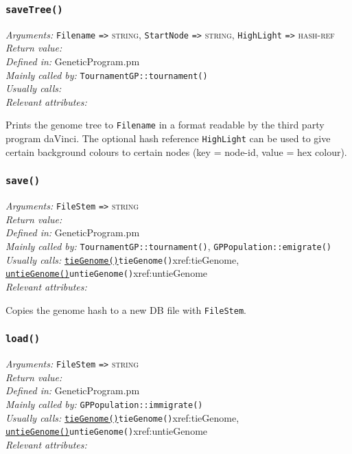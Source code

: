 \documentclass[a4paper]{article}
\begin{document}
\subsubsection{\texttt{saveTree()}}\label{xref:saveTree}
\begin{flushleft}
\textit{Arguments:} \texttt{Filename} \verb:=>: \textsc{string}, \texttt{StartNode} \verb:=>: \textsc{string}, \texttt{HighLight} \verb:=>: \textsc{hash-ref}\\
\textit{Return value:} \\
\textit{Defined in:} GeneticProgram.pm\\
\textit{Mainly called by:} \texttt{TournamentGP::tournament()}\\
\textit{Usually calls:} \\
\textit{Relevant attributes:}
\end{flushleft}

Prints the genome tree to \texttt{Filename} in a format readable by
the third party program daVinci.  The optional hash reference
\texttt{HighLight} can be used to give certain background colours
to certain nodes (key = node-id, value = hex colour).

\subsubsection{\texttt{save()}}\label{xref:save}
\begin{flushleft}
\textit{Arguments:} \texttt{FileStem} \verb:=>: \textsc{string}\\
\textit{Return value:} \\
\textit{Defined in:} GeneticProgram.pm\\
\textit{Mainly called by:} \texttt{TournamentGP::tournament()}, \texttt{GPPopulation::emigrate()}\\
\textit{Usually calls:} \hyperref[no]{\texttt{tieGenome()}}{\texttt{tieGenome()}}{xref:tieGenome}, \hyperref[no]{\texttt{untieGenome()}}{\texttt{untieGenome()}}{xref:untieGenome} \\
\textit{Relevant attributes:}
\end{flushleft}

Copies the genome hash to a new DB file with \texttt{FileStem}.

\subsubsection{\texttt{load()}}\label{xref:load}
\begin{flushleft}
\textit{Arguments:} \texttt{FileStem} \verb:=>: \textsc{string}\\
\textit{Return value:} \\
\textit{Defined in:} GeneticProgram.pm\\
\textit{Mainly called by:} \texttt{GPPopulation::immigrate()}\\
\textit{Usually calls:} \hyperref[no]{\texttt{tieGenome()}}{\texttt{tieGenome()}}{xref:tieGenome}, \hyperref[no]{\texttt{untieGenome()}}{\texttt{untieGenome()}}{xref:untieGenome} \\
\textit{Relevant attributes:}
\end{flushleft}
\end{document}
